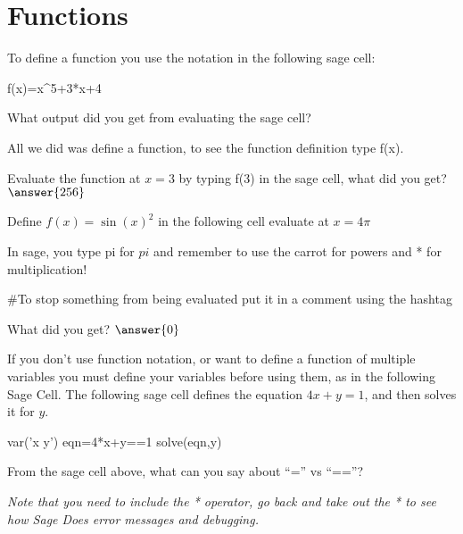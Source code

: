\documentclass{ximera}
\begin{document}
\section{Functions}
To define a function you use the notation in the following sage cell:
\begin{onlineOnly}
\begin{sageCell}
f(x)=x^5+3*x+4
\end{sageCell}
\end{onlineOnly}
\begin{question}
What output did you get from evaluating the sage cell?
\begin{multipleChoice}
\end{multipleChoice}
\begin{feedback}
All we did was define a function, to see the function definition type f(x).
\end{feedback}
Evaluate the function at $x=3$ by typing f(3) in the sage cell, what did you get? $\answer{256}$
\end{question}
\begin{question}
Define $f(x)=\sin(x)^2$ in the following cell evaluate at $x=4\pi$
\begin{hint}
In sage, you type pi for $pi$ and remember to use the carrot for powers and * for multiplication!
\end{hint}
\begin{onlineOnly}
\begin{sageCell}
#To stop something from being evaluated put it in a comment using the hashtag
\end{sageCell}
\end{onlineOnly}
What did you get?
$\answer{0}$
\end{question}
If you don't use function notation, or want to define a function of multiple variables you must define your variables before using them, as in the following Sage Cell. The following sage cell defines the equation $4x+y=1$, and then solves it for $y$.
\begin{onlineOnly}
\begin{sageCell}
var('x y')
eqn=4*x+y==1
solve(eqn,y)
\end{sageCell}
\end{onlineOnly}
\begin{question}
From the sage cell above, what can you say about ``='' vs ``==''?
\begin{multipleChoice}
\end{multipleChoice}
\begin{feedback}
\textit{Note that you need to include the * operator, go back and take out the * to see how Sage Does error messages and debugging.}
\end{feedback}
\end{question}
\end{document}
